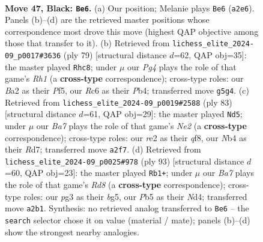 \documentclass[11pt]{article}
\begin{document}
\clearpage

\begin{figure}[p]\centering
\begin{subfigure}{0.46\textwidth}\centering
\resizebox{\linewidth}{!}{%
\newchessgame
\chessboard[
  setfen={4k3/1R6/2r5/1p2B1p1/rn6/4P1PP/b3RP2/6K1 b - - 4 47},
  showmover=false,
  pgfstyle=straightmove, color=movearrow, markmove={a2-e6}
]}
\caption{}
\end{subfigure}\hfill
\begin{subfigure}{0.46\textwidth}\centering
\resizebox{\linewidth}{!}{%
\newchessgame
\chessboard[
  setfen={r6r/8/5k2/2PR1p2/pp6/5KP1/1P3P2/R7 b - - 0 40},
  showmover=false,
  pgfstyle=straightmove, color=movearrow, markmove={h8-c8}
]}
\caption{}
\end{subfigure}
\\[4pt]
\begin{subfigure}{0.46\textwidth}\centering
\resizebox{\linewidth}{!}{%
\newchessgame
\chessboard[
  setfen={5Q2/3rn3/4k2P/pp2p1K1/8/P3R3/1PP5/7R b - - 4 42},
  showmover=false,
  pgfstyle=straightmove, color=movearrow, markmove={e7-d5}
]}
\caption{}
\end{subfigure}\hfill
\begin{subfigure}{0.46\textwidth}\centering
\resizebox{\linewidth}{!}{%
\newchessgame
\chessboard[
  setfen={8/6p1/8/6Bp/R2nk2P/P5P1/1Kp5/3r4 b - - 8 47},
  showmover=false,
  pgfstyle=straightmove, color=movearrow, markmove={d1-b1}
]}
\caption{}
\end{subfigure}
\caption{\textbf{Move 47, Black: \texttt{Be6}.} (a) Our position; Melanie plays \texttt{Be6} (\texttt{a2e6}). Panels (b)--(d) are the retrieved master positions whose correspondence most drove this move (highest QAP objective among those that transfer to it). (b) Retrieved from \texttt{lichess\_elite\_2024-09\_p0017\#3636} (ply 79) [structural distance $d$=62, QAP obj=35]: the master played \texttt{Rhc8}; under $\mu$ our \emph{Pg4} plays the role of that game's \emph{Rh1} (a \textbf{cross-type} correspondence); cross-type roles: our \emph{B}a2 as their \emph{P}f5, our \emph{R}c6 as their \emph{P}b4; transferred move \texttt{g5g4}. (c) Retrieved from \texttt{lichess\_elite\_2024-09\_p0019\#2588} (ply 83) [structural distance $d$=61, QAP obj=29]: the master played \texttt{Nd5}; under $\mu$ our \emph{Ba7} plays the role of that game's \emph{Ne2} (a \textbf{cross-type} correspondence); cross-type roles: our \emph{r}e2 as their \emph{q}f8, our \emph{N}b4 as their \emph{R}d7; transferred move \texttt{a2f7}. (d) Retrieved from \texttt{lichess\_elite\_2024-09\_p0025\#978} (ply 93) [structural distance $d$=60, QAP obj=23]: the master played \texttt{Rb1+}; under $\mu$ our \emph{Ba7} plays the role of that game's \emph{Rd8} (a \textbf{cross-type} correspondence); cross-type roles: our \emph{p}g3 as their \emph{b}g5, our \emph{P}b5 as their \emph{N}d4; transferred move \texttt{a2b1}. Synthesis: no retrieved analog transferred to \texttt{Be6} -- the \texttt{search} selector chose it on value (material / mate); panels (b)--(d) show the strongest nearby analogies.}
\label{fig:thought-m93}
\end{figure}
\end{document}
